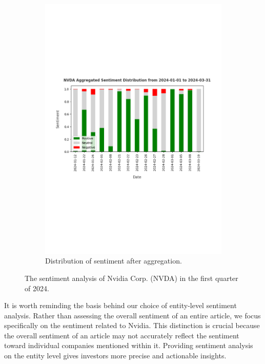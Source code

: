 \begin{figure}[htbp]
\begin{subfigure}{0.8\textwidth}
        \includegraphics[width=\textwidth]{img/experiment-stock/nvda-aggregated-a.pdf}
        \caption{Distribution of sentiment after aggregation.}
        \label{fig:elsa-experiment-stock-nvda-aggregated}
    \end{subfigure}
    \caption{The sentiment analysis of Nvidia Corp. (NVDA) in the first quarter of 2024.}
    \label{fig:elsa-experiment-stock-nvda-comparison}
\end{figure}

It is worth reminding the basis behind our choice of entity-level sentiment analysis. Rather than assessing the overall sentiment of an entire article, we focus specifically on the sentiment related to Nvidia. This distinction is crucial because the overall sentiment of an article may not accurately reflect the sentiment toward individual companies mentioned within it. Providing sentiment analysis on the entity level gives investors more precise and actionable insights.
 
